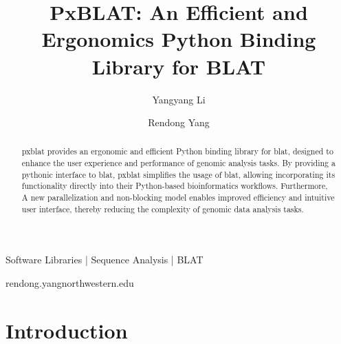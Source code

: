 
\title{PxBLAT: An Efficient and Ergonomics Python Binding Library for BLAT}

\author[1]{Yangyang Li}
\author[1,\Letter]{Rendong Yang }
\date{}

\maketitle

\begin{abstract}
	\acrshort{pxblat} provides an ergonomic and efficient Python binding library for \acrshort{blat}, designed to enhance the user experience and performance of genomic analysis tasks.
	By providing a pythonic interface to \acrshort{blat}, \acrshort{pxblat} simplifies the usage of \acrshort{blat}, allowing incorporating its functionality directly into their Python-based bioinformatics workflows.
	Furthermore, A new parallelization and non-blocking model enables improved efficiency and intuitive user interface, thereby reducing the complexity of genomic data analysis tasks.
\end{abstract}


\begin{keywords}
	Software Libraries |  Sequence Analysis | BLAT
\end{keywords}

\begin{corrauthor}
	rendong.yang\at northwestern.edu
\end{corrauthor}

\section*{Introduction}\label{sec:introduction}



